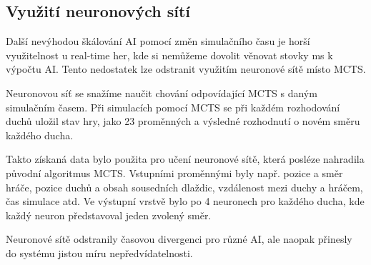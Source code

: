 \subsection{Využití neuronových sítí}
Další nevýhodou škálování AI pomocí změn simulačního času je horší využitelnost u real-time her, kde si nemůžeme dovolit věnovat stovky ms k výpočtu AI. Tento nedostatek lze odstranit využitím neuronové sítě místo MCTS.

Neuronovou síť se snažíme naučit chování odpovídající MCTS s daným simulačním časem. Při simulacích pomocí MCTS se při každém rozhodování duchů uložil stav hry, jako 23 proměnných a výsledné rozhodnutí o novém směru každého ducha.

Takto získaná data bylo použita pro učení neuronové sítě, která posléze nahradila původní algoritmus MCTS. Vstupními proměnnými byly např. pozice a směr hráče, pozice duchů a obsah sousedních dlaždic, vzdálenost mezi duchy a hráčem, čas simulace atd. Ve výstupní vrstvě bylo po 4 neuronech pro každého ducha, kde každý neuron představoval jeden zvolený směr.

Neuronové sítě odstranily časovou divergenci pro různé AI, ale naopak přinesly do systému jistou míru nepředvídatelnosti.
